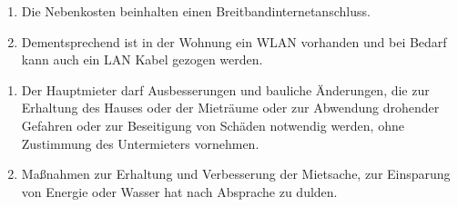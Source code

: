 \documentclass{scrreprt}[12pt,a4paper,twoside,duplex]
\begin{document}
\begin{contract}
\label{clause:internet}
\begin{enumerate}
	\item Die Nebenkosten beinhalten einen Breitbandinternetanschluss.

	\item Dementsprechend ist in der Wohnung ein WLAN vorhanden und bei Bedarf kann auch ein LAN Kabel gezogen werden.
\end{enumerate}
\end{contract}

\begin{contract}
\label{clause:baulicheMassnahmen}
\begin{enumerate}
	\item Der Hauptmieter darf Ausbesserungen und bauliche Änderungen, die zur Erhaltung des Hauses oder der Mieträume oder zur Abwendung drohender Gefahren oder zur Beseitigung von Schäden notwendig werden, ohne Zustimmung des Untermieters vornehmen.
	
	\item Ma{\ss}nahmen zur Erhaltung und Verbesserung der Mietsache, zur Einsparung von Energie oder Wasser hat  nach Absprache zu dulden.
\end{enumerate}
\end{contract}
\end{document}
